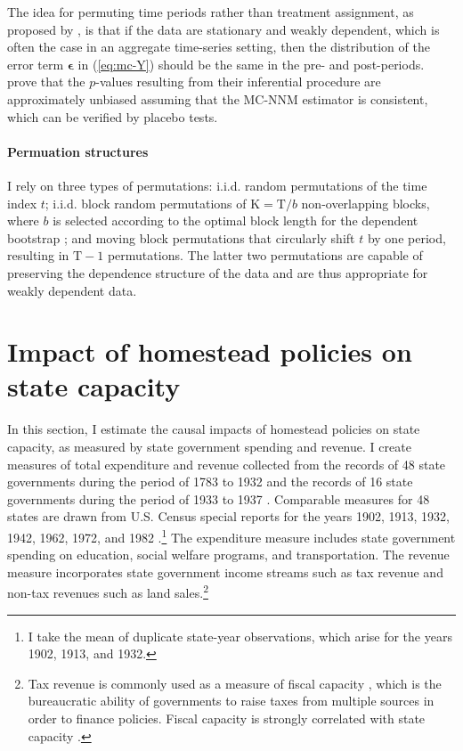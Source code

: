 \documentclass[hidelinks,12pt]{article}
\begin{document}
The idea for permuting time periods rather than treatment assignment, as proposed by \citet{abadie2010synthetic}, is that if the data are stationary and weakly dependent, which is often the case in an aggregate time-series setting, then the distribution of the error term $\boldsymbol{\epsilon}$ in (\ref{eq:mc-Y}) should be the same in the pre- and post-periods. \citet{chernozhukov2017exact} prove that the $p$-values resulting from their inferential procedure are approximately unbiased assuming that the MC-NNM estimator is consistent, which can be verified by placebo tests. 

\paragraph{Permuation structures}I rely on three types of permutations: i.i.d. random permutations of the time index $t$; i.i.d. block random permutations of $\text{K}=\text{T}/b$ non-overlapping blocks, where $b$ is selected according to the optimal block length for the dependent bootstrap \citep{politis2004automatic}; and moving block permutations that circularly shift $t$ by one period, resulting in $\text{T}-1$ permutations. The latter two permutations are capable of preserving the dependence structure of the data and are thus appropriate for weakly dependent data. 

\section{Impact of homestead policies on state capacity} \label{state-capacity}

In this section, I estimate the causal impacts of homestead policies on state capacity, as measured by state government spending and revenue. I create measures of total expenditure and revenue collected from the records of 48 state governments during the period of 1783 to 1932 \citep{sylla1993sources} and the records of 16 state governments during the period of 1933 to 1937 \citep{sylla1995sourcesa,sylla1995sourcesb}. Comparable measures for 48 states are drawn from U.S. Census special reports for the years 1902, 1913, 1932, 1942, 1962, 1972, and 1982 \citep{haines2010}.\footnote{I take the mean of duplicate state-year observations, which arise for the years 1902, 1913, and 1932.} The expenditure measure includes state government spending on education, social welfare programs, and transportation. The revenue measure incorporates state government income streams such as tax revenue and non-tax revenues such as land sales.\footnote{Tax revenue is commonly used as a measure of fiscal capacity \citep{lieberman2002taxation}, which is the bureaucratic ability of governments to raise taxes from multiple sources in order to finance policies. Fiscal capacity is strongly correlated with state capacity \citep{besley2010state}.} 
\end{document}
